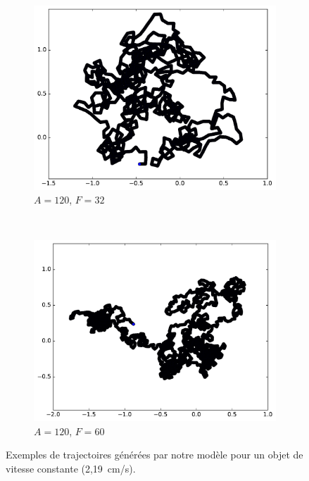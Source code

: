 \begin{appendices}
\begin{figure}[htbp]
\begin{subfigure}[t]{\subImgWmo}
			\includegraphics[width=\textwidth]{figures/ch3/synTraj_219_120_32}
			\caption[$A = 120$, $F=32$]{$A = 120$, $F=32$}
			\label{fig:synTraj_219_120_32}
		\end{subfigure}
		~
		\begin{subfigure}[t]{\subImgWmo}
			\centering
			\includegraphics[width=\textwidth]{figures/ch3/synTraj_219_120_60}
			\caption[$A = 120$, $F=60$]{$A = 120$, $F=60$}
			\label{fig:synTraj_219_120_60}
		\end{subfigure}
		\caption[Mouvements générés par notre modèle -- IV]{Exemples de trajectoires générées par notre modèle pour un objet de vitesse constante (2,19~cm/s).}
		\label{fig:motion105120}
	\end{figure}
	



\end{appendices}
